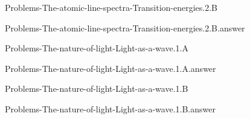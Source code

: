 \documentclass[main.tex]{subfiles}
\newcommand\chapterlabel{}
\begin{document}
\renewcommand\chapterlabel{Ch-radiation}
\begin{question}[ID=\the\value{numA}]
{Problems-The-atomic-line-spectra-Transition-energies.2.B}
\end{question}
   \begin{Form}
   \TextField[multiline,backgroundcolor=gray!20,borderwidth=0,width=0.43\textwidth  ,height=115pt, name=\the\value{numA}]  { }\end{Form}
\begin{solution}
{Problems-The-atomic-line-spectra-Transition-energies.2.B.answer}
\hspace{0.1cm}
\end{solution}


\renewcommand\chapterlabel{Ch-radiation}
\begin{question}[ID=\the\value{numA}]
{Problems-The-nature-of-light-Light-as-a-wave.1.A}
\end{question}
   \begin{Form}
   \TextField[multiline,backgroundcolor=gray!20,borderwidth=0,width=0.43\textwidth  ,height=115pt, name=\the\value{numA}]  { }\end{Form}
\begin{solution}
{Problems-The-nature-of-light-Light-as-a-wave.1.A.answer}
\hspace{0.1cm}
\end{solution}


\renewcommand\chapterlabel{Ch-radiation}
\begin{question}[ID=\the\value{numA}]
{Problems-The-nature-of-light-Light-as-a-wave.1.B}
\end{question}
   \begin{Form}
   \TextField[multiline,backgroundcolor=gray!20,borderwidth=0,width=0.43\textwidth  ,height=115pt, name=\the\value{numA}]  { }\end{Form}
\begin{solution}
{Problems-The-nature-of-light-Light-as-a-wave.1.B.answer}
\hspace{0.1cm}
\end{solution}
\end{document}
